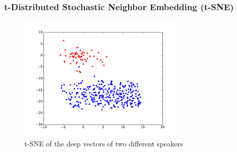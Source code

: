 \documentclass[11pt,english]{beamer}
\begin{document}


\begin{frame}
  \frametitle{t-Distributed Stochastic Neighbor Embedding (t-SNE)}
  \begin{figure}[!h]
      \centering
      \includegraphics[width=8cm]{../secondNet/tSNE_HOUDIN_TRUCHOT.pdf}
      \caption{t-SNE of the deep vectors of two different speakers}
  \end{figure}
\end{frame}
\end{document}

